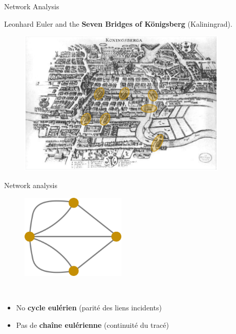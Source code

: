 \begin{frame}{Network Analysis}

Leonhard Euler and the \textbf{Seven Bridges of Königsberg} (Kaliningrad).


\begin{figure}
  \includegraphics[width=10cm]{Konigsberg.png}
\end{figure}

\end{frame}


\begin{frame}{Network analysis}

\begin{figure}
  \includegraphics[width=5cm]{Konigsberg_graph.png}
\end{figure}

~

\begin{itemize}
\item No \textbf{cycle eulérien} (parité des liens incidents)
\item Pas de \textbf{chaîne eulérienne} (continuité du tracé)
\end{itemize}


\end{frame}



